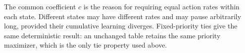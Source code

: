 The common coefficient $c$ is the reason for requiring equal action rates within each state. Different states may have different rates and may pause arbitrarily long, provided their cumulative learning diverges. Fixed-priority ties give the same deterministic result: an unchanged table retains the same priority maximizer, which is the only tie property used above.
